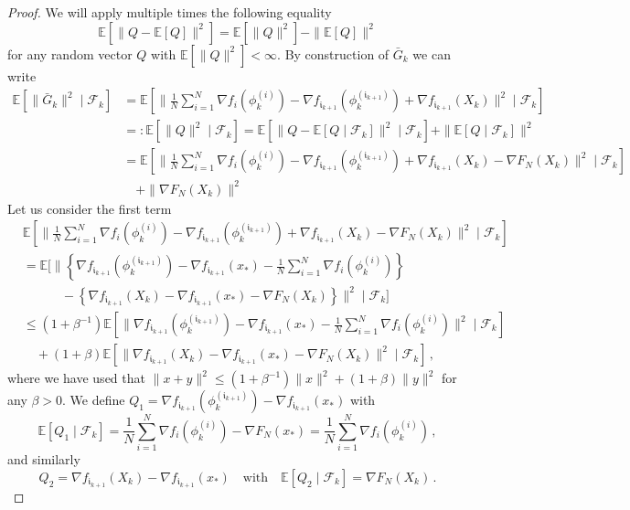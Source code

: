 \documentclass[12pt,openany]{book}
\theoremstyle{definition}
\theoremstyle{definition}
\newcommand{\cF}{\mathcal{F}}
\newcommand{\E}{\mathbb{E}}
\begin{document}
\begin{proof}
We will apply multiple times the following equality
\begin{equation}\label{eq:variance_formula}
\E[\|Q-\E[Q]\|^2] = \E[\|Q\|^2]-\|\E[Q]\|^2 
\end{equation}
for any random vector $Q$ with $\E[\|Q\|^2]<\infty$. By construction of $\bar G_k$ we can write
\begin{align*}
\E[\|\bar G_k\|^2 \mid \cF_k] &= \E[\|\frac1N\sum_{i=1}^N \nabla f_i(\phi_k^{(i)})- \nabla f_{\mathfrak i_{k+1}}(\phi_k^{(\mathfrak i_{k+1})})+\nabla f_{\mathfrak i_{k+1}}(X_k)\|^2\mid \cF_k]\\
&=: \E[\|Q\|^2\mid \cF_k] = \E[\|Q-\E[Q\mid\cF_k]\|^2\mid \cF_k] + \|\E[Q\mid\cF_k]\|^2\\
&=\E[\|\frac1N\sum_{i=1}^N \nabla f_i(\phi_k^{(i)})- \nabla f_{\mathfrak i_{k+1}}(\phi_k^{(\mathfrak i_{k+1})})+\nabla f_{\mathfrak i_{k+1}}(X_k) - \nabla F_N(X_k)\|^2\mid \cF_k]\\ &\quad+\|\nabla F_N(X_k)\|^2
\end{align*}
Let us consider the first term
\begin{align*}
&\E[\|\frac1N\sum_{i=1}^N \nabla f_i(\phi_k^{(i)})- \nabla f_{\mathfrak i_{k+1}}(\phi_k^{(\mathfrak i_{k+1})})+\nabla f_{\mathfrak i_{k+1}}(X_k) - \nabla F_N(X_k)\|^2\mid \cF_k]\\
&=\E[\|\left\{\nabla f_{\mathfrak i_{k+1}}(\phi_k^{(\mathfrak i_{k+1})}) - \nabla f_{\mathfrak i_{k+1}}(x_\ast)-\frac1N\sum_{i=1}^N \nabla f_i(\phi_k^{(i)})\right\}\\&\quad\quad\quad- \left\{\nabla f_{\mathfrak i_{k+1}}(X_k) - \nabla f_{\mathfrak i_{k+1}}(x_\ast) - \nabla F_N(X_k)\right\}\|^2\mid \cF_k]\\
&\le (1+\beta^{-1}) \E[\|\nabla f_{\mathfrak i_{k+1}}(\phi_k^{(\mathfrak i_{k+1})}) - \nabla f_{\mathfrak i_{k+1}}(x_\ast)-\frac1N\sum_{i=1}^N \nabla f_i(\phi_k^{(i)})\|^2\mid\cF_k]\\ &\quad+(1+\beta)\E[\|\nabla f_{\mathfrak i_{k+1}}(X_k) - \nabla f_{\mathfrak i_{k+1}}(x_\ast) - \nabla F_N(X_k)\|^2\mid\cF_k]\,,
\end{align*}
where we have used that $\|x+y\|^2 \le (1+\beta^{-1})\|x\|^2+(1+\beta)\|y\|^2$ for any $\beta>0$. We define $Q_1 = \nabla f_{\mathfrak i_{k+1}}(\phi_k^{(\mathfrak i_{k+1})}) - \nabla f_{\mathfrak i_{k+1}}(x_\ast)$ with
\[\E[Q_1\mid\cF_k] = \frac1N\sum_{i=1}^N \nabla f_i(\phi_k^{(i)})-\nabla F_N(x_\ast)=\frac1N\sum_{i=1}^N \nabla f_i(\phi_k^{(i)})\,, \]
and similarly
\[Q_2 = \nabla f_{\mathfrak i_{k+1}}(X_k) - \nabla f_{\mathfrak i_{k+1}}(x_\ast) \quad \text{with}\quad \E[Q_2\mid\cF_k] = \nabla F_N(X_k)\,.\]

\end{proof}
\end{document}
